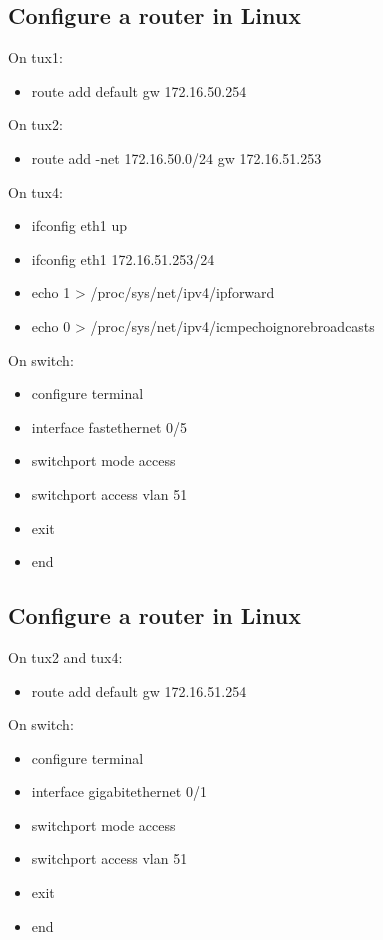 \documentclass[11pt,a4paper,reqno]{article}
\numberwithin{equation}{section}
\begin{document}
\begin{appendices}
\subsection{Configure a router in Linux}

On tux1:
\begin{itemize}[label=-]
\item route add default gw 172.16.50.254
\end{itemize}

On tux2:

\begin{itemize}[label=-]
\item route add -net 172.16.50.0/24 gw 172.16.51.253
\end{itemize}

On tux4:

\begin{itemize}[label=-]
\item ifconfig eth1 up
\item ifconfig eth1 172.16.51.253/24
\item echo 1 > /proc/sys/net/ipv4/ip\textunderscore forward
\item echo 0 > /proc/sys/net/ipv4/icmp\textunderscore echo\textunderscore ignore\textunderscore broadcasts
\end{itemize}

On switch:

\begin{itemize}[label=-]
\item configure terminal
\item interface fastethernet 0/5
\item switchport mode access
\item switchport access vlan 51
\item exit
\item end
\end{itemize}

\subsection{Configure a router in Linux}

On tux2 and tux4:

\begin{itemize}[label=-]
\item route add default gw 172.16.51.254
\end{itemize}

On switch:

\begin{itemize}[label=-]
\item configure terminal
\item interface gigabitethernet 0/1
\item switchport mode access
\item switchport access vlan 51
\item exit
\item end
\end{itemize}


\end{appendices}
\end{document}
